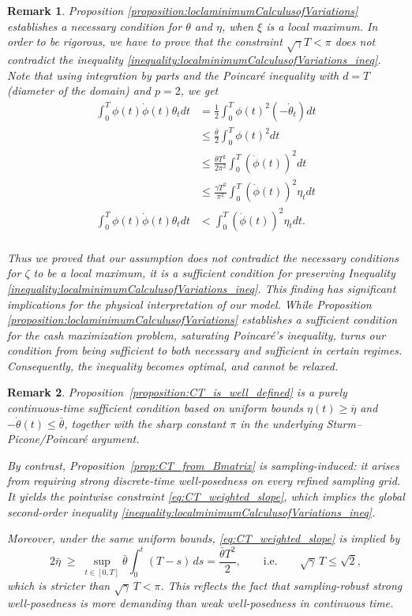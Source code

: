 \documentclass[final,3p,authoryear,12pt]{elsarticle}
\newtheorem{remark}{Remark}
\begin{document}
\begin{remark}
    Proposition \ref{proposition:loclaminimumCalculusofVariations} establishes a necessary condition for $\theta$ and $\eta$, when $\xi$ is a local maximum. In order to be rigorous, we have to prove that the constraint $\sqrt{\gamma}T<\pi$ does not contradict the inequality \eqref{inequality:localminimumCalculusofVariations_ineq}. 
    Note that using integration by parts and the Poincar\'e inequality with $d=T$ (diameter of the domain) and $p=2$, we get 
    \begin{align*}
        \int_{0}^{T}\phi(t)\dot \phi(t)\theta_{t}dt &= \frac{1}{2}\int_{0}^{T}\phi(t)^{2}(-\dot \theta_{t})dt \\
        &\le\frac{\bar{\theta}}{2}\int_{0}^{T}\phi(t)^{2}dt\\
        &\le\frac{\bar{\theta}T^{2}}{2\pi^{2}}\int_{0}^{T}(\dot\phi(t))^{2}dt\\
        &\le\frac{\gamma T^{2}}{\pi^{2}}\int_{0}^{T}(\dot\phi(t))^{2}\eta_{t}dt \\
        \int_{0}^{T}\phi(t)\dot \phi(t)\theta_{t}dt&<\int_{0}^{T}(\dot\phi(t))^{2}\eta_{t}dt.\\
    \end{align*}

Thus we proved that our assumption does not contradict the necessary conditions for $\zeta$ to be a local maximum, it is a sufficient condition for preserving Inequality \eqref{inequality:localminimumCalculusofVariations_ineq}. This finding has significant implications for the physical interpretation of our model. While Proposition \ref{proposition:loclaminimumCalculusofVariations} establishes a sufficient condition for the cash maximization problem, saturating Poincar\'e's inequality, turns our condition from being sufficient to both necessary and sufficient in certain regimes. Consequently, the inequality becomes optimal, and cannot be relaxed.
\end{remark}

\begin{remark}
\label{remark:comparison_sampling_admissibility}
Proposition~\ref{proposition:CT_is_well_defined} is a purely continuous-time
sufficient condition based on uniform bounds $\eta(t)\ge \bar\eta$ and
$-\dot\theta(t)\le \bar\theta$, together with the sharp constant $\pi$ in the
underlying Sturm--Picone/Poincar\'e argument.

By contrast, Proposition~\ref{prop:CT_from_Bmatrix} is \emph{sampling-induced}:
it arises from requiring \emph{strong discrete-time well-posedness on every refined sampling grid}.
It yields the pointwise constraint \eqref{eq:CT_weighted_slope}, which implies the global
second-order inequality \eqref{inequality:localminimumCalculusofVariations_ineq}.

Moreover, under the same uniform bounds, \eqref{eq:CT_weighted_slope} is implied by
\[
2\bar\eta \;\ge\; \sup_{t\in[0,T]}\bar\theta\int_0^t (T-s)\,ds
= \frac{\bar\theta T^{2}}{2},
\qquad\text{i.e.}\qquad \sqrt{\gamma}\,T \le \sqrt{2},
\]
which is stricter than $\sqrt{\gamma}\,T<\pi$.
This reflects the fact that sampling-robust strong well-posedness is more
demanding than weak well-posedness in continuous time.
\end{remark}
\end{document}
